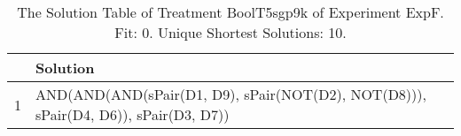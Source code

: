 \begin{table}[ht]
\centering
\begin{tabular}{rp{9cm}}
  \hline
 & Solution \\ 
  \hline
1 & AND(AND(AND(sPair(D1, D9), sPair(NOT(D2), NOT(D8))), sPair(D4, D6)), sPair(D3, D7)) \\ 
   \hline
\end{tabular}
\caption{The Solution Table of Treatment BoolT5sgp9k of Experiment ExpF. Fit: 0. Unique Shortest Solutions: 10.} 
\end{table}
